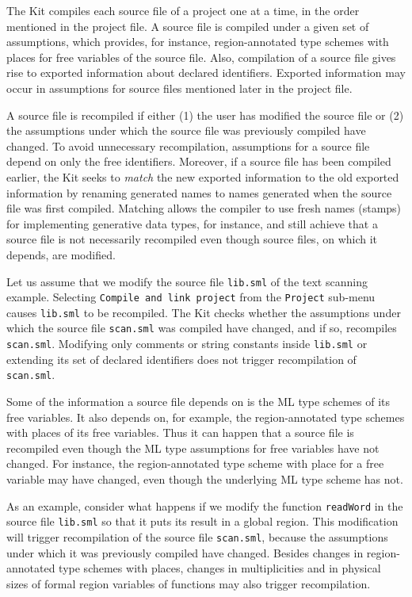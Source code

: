 \documentclass[12pt]{book}
\begin{document}
The Kit compiles each source file of a project one at a time, in the
order mentioned in the project file. A source file is compiled under
a given set of assumptions, which provides, for instance, region-annotated type
schemes with places for free variables of the source file. Also, compilation of a
source file gives rise to exported information about declared
identifiers. Exported information may occur in assumptions for source
files mentioned later in the project file.

A source file is recompiled if either (1) the user has modified the
source file or (2) the assumptions under which the source file was
previously compiled have changed. To avoid unnecessary recompilation,
assumptions for a source file depend on only the free identifiers.
Moreover, if a source file has been compiled earlier, the Kit 
seeks to {\em match\/} the new exported information to
the old exported information by renaming generated names to names
generated when the source file was first compiled. Matching allows the
compiler to use fresh names (stamps) for implementing generative data
types, for instance, and still achieve that a source file is not
necessarily recompiled even though source files, on which it depends,
are modified.

Let us assume that we modify the source file {\tt lib.sml} of the
text scanning example.  Selecting {\tt Compile and link project} from
the {\tt Project} sub-menu  causes {\tt lib.sml} to be recompiled.
The Kit checks whether the assumptions under which the source
file {\tt scan.sml} was compiled have changed, and if so, recompiles 
{\tt scan.sml}.  Modifying only comments or string constants inside
{\tt lib.sml} or extending its set of declared identifiers does not
trigger recompilation of {\tt scan.sml}.  

Some of the information a source file depends on is the ML type
schemes of its free variables. It also depends on, for example, 
the region-annotated type schemes with places of its free variables. 
Thus it can happen that a source file is
recompiled even though the ML type assumptions for free variables have
not changed. For instance, the region-annotated type scheme with place for a free variable
may have changed, even though the underlying ML type scheme has not.

As an example, consider what happens if we modify the function {\tt readWord} in the
source file {\tt lib.sml} so that it puts its result in a global region. This modification
will trigger recompilation of the source file {\tt scan.sml}, because
the assumptions under which it was previously compiled have
changed. Besides changes in region-annotated type schemes with places, changes in
multiplicities and in physical sizes of formal region variables of
functions may also trigger recompilation.
\end{document}
